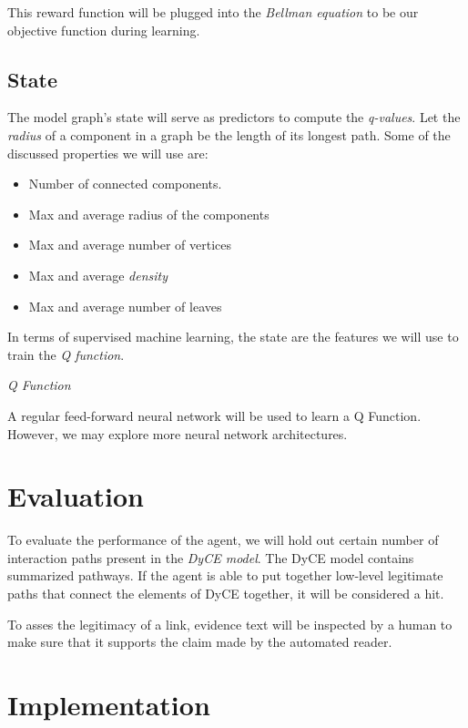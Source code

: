 \documentclass[12pt]{article}
\begin{document}

This reward function will be plugged into the \emph{Bellman equation} to be our objective function during learning.

\subsection{State}

The model graph's state will serve as predictors to compute the \emph{q-values}. Let the \emph{radius} of a component in a graph be the length of its longest path. Some of the discussed properties we will use are:

\begin{itemize}
  \item Number of connected components.
  \item Max and average radius of the components
  \item Max and average number of vertices
  \item Max and average \emph{density}
  \item Max and average number of leaves
\end{itemize}

In terms of supervised machine learning, the state are the features we will use to train the \emph{Q function}.

\emph{Q Function}

A regular feed-forward neural network will be used to learn a Q Function. However, we may explore more neural network architectures.

\section{Evaluation}

To evaluate the performance of the agent, we will hold out certain number of interaction paths present in the \emph{DyCE model}. The DyCE model contains summarized pathways. If the agent is able to put together low-level legitimate paths that connect the elements of DyCE together, it will be considered a hit.

To asses the legitimacy of a link, evidence text will be inspected by a human to make sure that it supports the claim made by the automated reader.


\section{Implementation}
\end{document}
